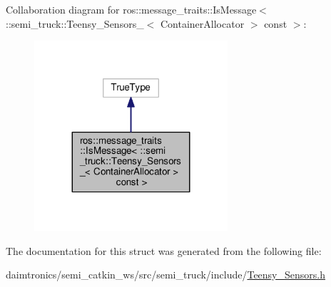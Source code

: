 Collaboration diagram for ros\+:\+:message\+\_\+traits\+:\+:Is\+Message$<$ \+:\+:semi\+\_\+truck\+:\+:Teensy\+\_\+\+Sensors\+\_\+$<$ Container\+Allocator $>$ const $>$\+:\nopagebreak
\begin{figure}[H]
\begin{center}
\leavevmode
\includegraphics[width=203pt]{structros_1_1message__traits_1_1_is_message_3_01_1_1semi__truck_1_1_teensy___sensors___3_01_cont42eab6994307cc549083cfcb31853bee}
\end{center}
\end{figure}


The documentation for this struct was generated from the following file\+:\begin{DoxyCompactItemize}
\item 
daimtronics/semi\+\_\+catkin\+\_\+ws/src/semi\+\_\+truck/include/\hyperlink{_teensy___sensors_8h}{Teensy\+\_\+\+Sensors.\+h}\end{DoxyCompactItemize}
